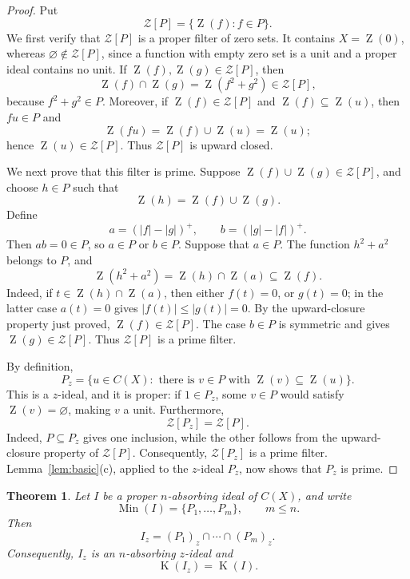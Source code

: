 \documentclass[11pt]{amsart}
\newtheorem{theorem}{Theorem}[section]
\theoremstyle{definition}
\theoremstyle{remark}
\DeclareMathOperator{\Min}{Min}
\DeclareMathOperator{\Z}{Z}
\DeclareMathOperator{\K}{K}
\newcommand{\CZ}{\mathcal Z}
\begin{document}
\begin{proof}
Put
\[
\CZ[P]=\{\Z(f):f\in P\}.
\]
We first verify that $\CZ[P]$ is a proper filter of zero sets.
It contains $X=\Z(0)$, whereas $\varnothing\notin\CZ[P]$, since
a function with empty zero set is a unit and a proper ideal contains
no unit. If $\Z(f),\Z(g)\in\CZ[P]$, then
\[
\Z(f)\cap\Z(g)=\Z(f^2+g^2)\in\CZ[P],
\]
because $f^2+g^2\in P$. Moreover, if
$\Z(f)\in\CZ[P]$ and $\Z(f)\subseteq\Z(u)$, then
$fu\in P$ and
\[
\Z(fu)=\Z(f)\cup\Z(u)=\Z(u);
\]
hence $\Z(u)\in\CZ[P]$. Thus $\CZ[P]$ is upward closed.

We next prove that this filter is prime. Suppose
$\Z(f)\cup\Z(g)\in\CZ[P]$, and choose $h\in P$ such that
\[
\Z(h)=\Z(f)\cup\Z(g).
\]
Define
\[
a=(|f|-|g|)^+,\qquad b=(|g|-|f|)^+.
\]
Then $ab=0\in P$, so $a\in P$ or $b\in P$. Suppose that $a\in P$.
The function $h^2+a^2$ belongs to $P$, and
\[
\Z(h^2+a^2)=\Z(h)\cap\Z(a)\subseteq\Z(f).
\]
Indeed, if $t\in\Z(h)\cap\Z(a)$, then either $f(t)=0$, or
$g(t)=0$; in the latter case $a(t)=0$ gives
$|f(t)|\le |g(t)|=0$. By the upward-closure property just proved,
$\Z(f)\in\CZ[P]$. The case $b\in P$ is symmetric and gives
$\Z(g)\in\CZ[P]$. Thus $\CZ[P]$ is a prime filter.

By definition,
\[
P_z=\{u\in C(X):\text{ there is }v\in P
                    \text{ with }\Z(v)\subseteq\Z(u)\}.
\]
This is a $z$-ideal, and it is proper: if $1\in P_z$, some
$v\in P$ would satisfy $\Z(v)=\varnothing$, making $v$ a unit.
Furthermore,
\[
\CZ[P_z]=\CZ[P].
\]
Indeed, $P\subseteq P_z$ gives one inclusion, while the other follows
from the upward-closure property of $\CZ[P]$. Consequently,
$\CZ[P_z]$ is a prime filter. Lemma~\ref{lem:basic}(c), applied to
the $z$-ideal $P_z$, now shows that $P_z$ is prime.
\end{proof}

\begin{theorem}
\label{thm:z-closure-nabs}
Let $I$ be a proper $n$-absorbing ideal of $C(X)$, and write
\[
\Min(I)=\{P_1,\ldots,P_m\},\qquad m\le n.
\]
Then
\[
I_z=(P_1)_z\cap\cdots\cap(P_m)_z.
\]
Consequently, $I_z$ is an $n$-absorbing $z$-ideal and
\[
\K(I_z)=\K(I).
\]
\end{theorem}
\end{document}

